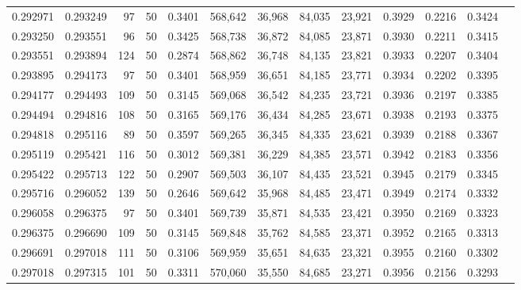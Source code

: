 \begin{tabular}{rrrrrrrrrrrrr}
0.292971 & 0.293249 &    97 &  50 &                                     0.3401 & 568,642 &  36,968 &  84,035 &  23,921 & 0.3929 & 0.2216 & 0.3424 \\
0.293250 & 0.293551 &    96 &  50 &                                     0.3425 & 568,738 &  36,872 &  84,085 &  23,871 & 0.3930 & 0.2211 & 0.3415 \\
0.293551 & 0.293894 &   124 &  50 &                                     0.2874 & 568,862 &  36,748 &  84,135 &  23,821 & 0.3933 & 0.2207 & 0.3404 \\
0.293895 & 0.294173 &    97 &  50 &                                     0.3401 & 568,959 &  36,651 &  84,185 &  23,771 & 0.3934 & 0.2202 & 0.3395 \\
0.294177 & 0.294493 &   109 &  50 &                                     0.3145 & 569,068 &  36,542 &  84,235 &  23,721 & 0.3936 & 0.2197 & 0.3385 \\
0.294494 & 0.294816 &   108 &  50 &                                     0.3165 & 569,176 &  36,434 &  84,285 &  23,671 & 0.3938 & 0.2193 & 0.3375 \\
0.294818 & 0.295116 &    89 &  50 &                                     0.3597 & 569,265 &  36,345 &  84,335 &  23,621 & 0.3939 & 0.2188 & 0.3367 \\
0.295119 & 0.295421 &   116 &  50 &                                     0.3012 & 569,381 &  36,229 &  84,385 &  23,571 & 0.3942 & 0.2183 & 0.3356 \\
0.295422 & 0.295713 &   122 &  50 &                                     0.2907 & 569,503 &  36,107 &  84,435 &  23,521 & 0.3945 & 0.2179 & 0.3345 \\
0.295716 & 0.296052 &   139 &  50 &                                     0.2646 & 569,642 &  35,968 &  84,485 &  23,471 & 0.3949 & 0.2174 & 0.3332 \\
0.296058 & 0.296375 &    97 &  50 &                                     0.3401 & 569,739 &  35,871 &  84,535 &  23,421 & 0.3950 & 0.2169 & 0.3323 \\
0.296375 & 0.296690 &   109 &  50 &                                     0.3145 & 569,848 &  35,762 &  84,585 &  23,371 & 0.3952 & 0.2165 & 0.3313 \\
0.296691 & 0.297018 &   111 &  50 &                                     0.3106 & 569,959 &  35,651 &  84,635 &  23,321 & 0.3955 & 0.2160 & 0.3302 \\
0.297018 & 0.297315 &   101 &  50 &                                     0.3311 & 570,060 &  35,550 &  84,685 &  23,271 & 0.3956 & 0.2156 & 0.3293 \\

\end{tabular}
